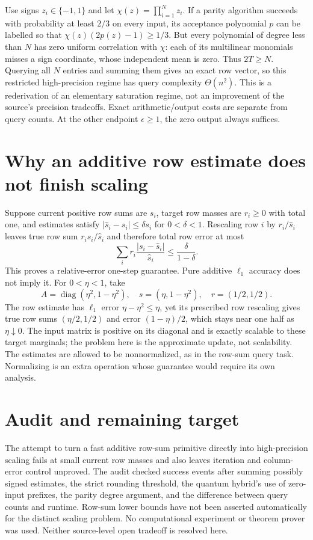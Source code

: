 \documentclass[11pt]{article}
\begin{document}
Use signs $z_i\in\{-1,1\}$ and let
$\chi(z)=\prod_{i=1}^N z_i$. If a parity algorithm succeeds
with probability at least $2/3$ on every input, its acceptance
polynomial $p$ can be labelled so that
$\chi(z)(2p(z)-1)\ge1/3$. But every polynomial of degree less
than $N$ has zero uniform correlation with $\chi$: each of its
multilinear monomials misses a sign coordinate, whose independent
mean is zero. Thus $2T\ge N$. Querying all $N$ entries and
summing them gives an exact row vector, so this restricted
high-precision regime has query complexity $\Theta(n^2)$.
This is a rederivation of an elementary saturation regime, not
an improvement of the source's precision tradeoffs. Exact
arithmetic/output costs are separate from query counts. At the
other endpoint $\epsilon\ge1$, the zero output always suffices.

\section{Why an additive row estimate does not finish scaling}
Suppose current positive row sums are $s_i$, target row masses
are $r_i\ge0$ with total one, and estimates satisfy
$|\widehat s_i-s_i|\le\delta s_i$ for $0<\delta<1$.
Rescaling row $i$ by $r_i/\widehat s_i$ leaves true row sum
$r_i s_i/\widehat s_i$ and therefore total row error at most
\[
 \sum_i r_i\frac{|s_i-\widehat s_i|}{\widehat s_i}
 \le\frac{\delta}{1-\delta}.
\]
This proves a relative-error one-step guarantee. Pure additive
$\ell_1$ accuracy does not imply it. For $0<\eta<1$, take
\[
 A=\operatorname{diag}(\eta^2,1-\eta^2),\quad
 \widehat s=(\eta,1-\eta^2),\quad r=(1/2,1/2).
\]
The row estimate has $\ell_1$ error $\eta-\eta^2\le\eta$,
yet its prescribed row rescaling gives true row sums
$(\eta/2,1/2)$ and error $(1-\eta)/2$, which stays near
one half as $\eta\downarrow0$. The input matrix is positive
on its diagonal and is exactly scalable to these target
marginals; the problem here is the approximate update, not
scalability. The estimates are allowed to be nonnormalized, as
in the row-sum query task. Normalizing is an extra operation
whose guarantee would require its own analysis.

\section{Audit and remaining target}
The attempt to turn a fast additive row-sum primitive directly
into high-precision scaling fails at small current row masses
and also leaves iteration and column-error control unproved.
The audit checked success events after summing possibly signed
estimates, the strict rounding threshold, the quantum hybrid's
use of zero-input prefixes, the parity degree argument, and the
difference between query counts and runtime. Row-sum lower
bounds have not been asserted automatically for the distinct
scaling problem. No computational experiment or theorem prover
was used. Neither source-level open tradeoff is resolved here.
\end{document}
